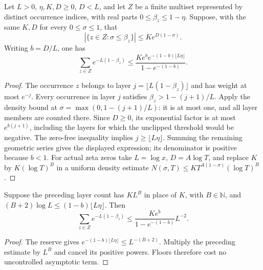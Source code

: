 \begin{lemma}
\label{construction:zero-layers}
\leanok
Let $L>0$, $\eta,K,D\ge0$, $D<L$, and let $Z$ be a finite multiset
represented by distinct occurrence indices, with real parts
$0\le\beta_z\le1-\eta$.  Suppose, with the same $K,D$ for every
$0\le\sigma\le1$, that
\[
 |\{z\in Z:\sigma\le\beta_z\}|\le K e^{D(1-\sigma)}.
\]
Writing $b=D/L$, one has
\[
 \sum_{z\in Z}e^{-L(1-\beta_z)}
 \le \frac{Ke^b e^{-(1-b)\lfloor L\eta\rfloor}}{1-e^{-(1-b)}}.
\]
\end{lemma}
\begin{proof}
The occurrence $z$ belongs to layer
$j=\lfloor L(1-\beta_z)\rfloor$ and has weight at most $e^{-j}$.
Every occurrence in layer $j$ satisfies
$\beta_z>1-(j+1)/L$.
Apply the density bound at
$\sigma=\max(0,1-(j+1)/L)$: it is at most one, and all layer members
are counted there.  Since $D\ge0$, its exponential factor is at most
$e^{b(j+1)}$, including the layers for which the unclipped threshold
would be negative.
The zero-free inequality implies $j\ge\lfloor L\eta\rfloor$.
Summing the remaining geometric series gives the displayed expression;
its denominator is positive because $b<1$.
For actual zeta zeros take $L=\log x$, $D=A\log T$, and replace $K$
by $K(\log T)^B$ in a uniform density estimate
$N(\sigma,T)\le KT^{A(1-\sigma)}(\log T)^B$.
\end{proof}

\begin{lemma}
\label{construction:zero-reserve}
\leanok
Suppose the preceding layer count has $K L^B$ in place of $K$, with
$B\in\mathbb N$, and
$(B+2)\log L\le(1-b)\lfloor L\eta\rfloor$.
Then
\[
 \sum_{z\in Z}e^{-L(1-\beta_z)}
 \le \frac{Ke^b}{1-e^{-(1-b)}}L^{-2}.
\]
\end{lemma}
\begin{proof}
The reserve gives
$e^{-(1-b)\lfloor L\eta\rfloor}\le L^{-(B+2)}$.
Multiply the preceding estimate by $L^B$ and cancel its positive
powers.  Floors therefore cost no uncontrolled asymptotic term.
\end{proof}

